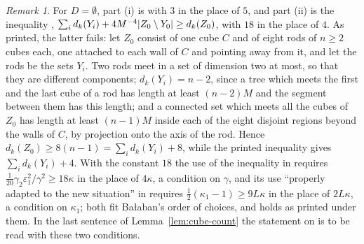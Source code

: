 \documentclass[11pt]{preprint}
\DeclarePairedDelimiter{\abs}{\lvert}{\rvert}
\numberwithin{equation}{section}
\theoremstyle{definition}
\theoremstyle{remark}
\newtheorem{remark}[lemma]{Remark}
\theoremstyle{plain}
\begin{document}
\begin{remark}\label{rem:rg2-232}
For $D = \emptyset$, part (i) is \cite[(2.27), p.~18]{BalabanRG2} with $3$ in the place of $5$, and part (ii) is the inequality \cite[(2.32), p.~18]{BalabanRG2}, $\sum_id_k(Y_i) + 4M^{-4}\abs{Z_0 \setminus Y_0} \geq d_k(Z_0)$, with $18$ in the place of $4$. As printed, the latter fails: let $Z_0$ consist of one cube $C$ and of eight rods of $n \geq 2$ cubes each, one attached to each wall of $C$ and pointing away from it, and let the rods be the sets $Y_i$. Two rods meet in a set of dimension two at most, so that they are different components; $d_k(Y_i) = n - 2$, since a tree which meets the first and the last cube of a rod has length at least $(n - 2)M$ and the segment between them has this length; and a connected set which meets all the cubes of $Z_0$ has length at least $(n - 1)M$ inside each of the eight disjoint regions beyond the walls of $C$, by projection onto the axis of the rod. Hence $d_k(Z_0) \geq 8(n - 1) = \sum_id_k(Y_i) + 8$, while the printed inequality gives $\sum_id_k(Y_i) + 4$. With the constant $18$ the use of the inequality in \cite[p.~18]{BalabanRG2} requires $\frac{1}{20}\gamma_2\varepsilon_1^2/\gamma^2 \geq 18\kappa$ in the place of $4\kappa$, a condition on $\gamma$, and its use ``properly adapted to the new situation'' in \cite[p.~20]{BalabanRG2} requires $\frac12(\kappa_1 - 1) \geq 9L\kappa$ in the place of $2L\kappa$, a condition on $\kappa_1$; both fit Ba{\l}aban's order of choices, and \cite[Lemma~3]{BalabanRG2} holds as printed under them. In the last sentence of Lemma~\ref{lem:cube-count} the statement on \cite[Lemmata~1--3]{BalabanRG2} is to be read with these two conditions.
\end{remark}
\end{document}
